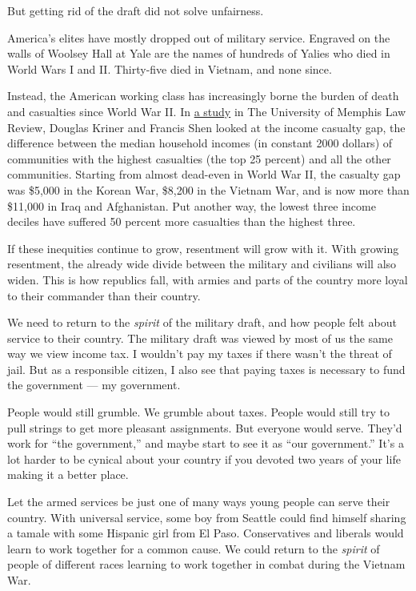 But getting rid of the draft did not solve unfairness.

America's elites have mostly dropped out of military service. Engraved
on the walls of Woolsey Hall at Yale are the names of hundreds of Yalies
who died in World Wars I and II. Thirty-five died in Vietnam, and none
since.

Instead, the American working class has increasingly borne the burden of
death and casualties since World War II. In
\href{http://www.memphis.edu/law/documents/kriner-shen46.pdf}{a study}
in The University of Memphis Law Review, Douglas Kriner and Francis Shen
looked at the income casualty gap, the difference between the median
household incomes (in constant 2000 dollars) of communities with the
highest casualties (the top 25 percent) and all the other communities.
Starting from almost dead-even in World War II, the casualty gap was
\$5,000 in the Korean War, \$8,200 in the Vietnam War, and is now more
than \$11,000 in Iraq and Afghanistan. Put another way, the lowest three
income deciles have suffered 50 percent more casualties than the highest
three.

If these inequities continue to grow, resentment will grow with it. With
growing resentment, the already wide divide between the military and
civilians will also widen. This is how republics fall, with armies and
parts of the country more loyal to their commander than their country.

We need to return to the \emph{spirit} of the military draft, and how
people felt about service to their country. The military draft was
viewed by most of us the same way we view income tax. I wouldn't pay my
taxes if there wasn't the threat of jail. But as a responsible citizen,
I also see that paying taxes is necessary to fund the government --- my
government.

People would still grumble. We grumble about taxes. People would still
try to pull strings to get more pleasant assignments. But everyone would
serve. They'd work for ``the government,'' and maybe start to see it as
``our government.'' It's a lot harder to be cynical about your country
if you devoted two years of your life making it a better place.

Let the armed services be just one of many ways young people can serve
their country. With universal service, some boy from Seattle could find
himself sharing a tamale with some Hispanic girl from El Paso.
Conservatives and liberals would learn to work together for a common
cause. We could return to the \emph{spirit} of people of different races
learning to work together in combat during the Vietnam War.

